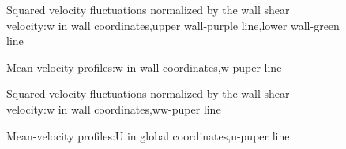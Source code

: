 \begin{figure}[H]
\centering
 \caption{Squared velocity fluctuations normalized by the wall shear velocity:w in wall coordinates,upper wall-purple line,lower wall-green line}
\label{pd}
\end{figure}

\begin{figure}[H]
\centering
 \caption{Mean-velocity profiles:w in wall coordinates,w-puper line}
\label{pd}
\end{figure}

\begin{figure}[H]
\centering
 \caption{Squared velocity fluctuations normalized by the wall shear velocity:w in wall coordinates,ww-puper line}
\label{pd}
\end{figure}

\begin{figure}[H]
\centering
 \caption{Mean-velocity profiles:U in global coordinates,u-puper line}
\label{pd}
\end{figure}


